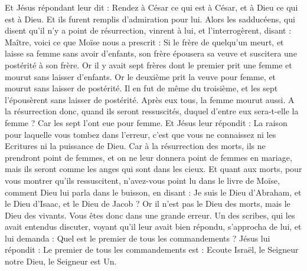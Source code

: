 \begin{multicols}{2}
Et Jésus répondant leur dit : Rendez à César ce qui est à César, et à Dieu ce qui est à Dieu. Et ils furent remplis d'admiration pour lui.
Alors les sadducéens, qui disent qu'il n'y a point de résurrection, vinrent à lui, et l'interrogèrent, disant :
Maître, voici ce que Moïse nous a prescrit : Si le frère de quelqu'un meurt, et laisse sa femme sans avoir d'enfants, son frère épousera sa veuve et suscitera une postérité à son frère.
Or il y avait sept frères dont le premier prit une femme et mourut sans laisser d'enfants.
Or le deuxième prit la veuve pour femme, et mourut sans laisser de postérité. Il en fut de même du troisième,
et les sept l'épousèrent sans laisser de postérité. Après eux tous, la femme mourut aussi.
A la résurrection donc, quand ils seront ressuscités, duquel d'entre eux sera-t-elle la femme ? Car les sept l'ont eue pour femme.
Et Jésus leur répondit : La raison pour laquelle vous tombez dans l'erreur, c'est que vous ne connaissez ni les Ecritures ni la puissance de Dieu.
Car à la résurrection des morts, ils ne prendront point de femmes, et on ne leur donnera point de femmes en mariage, mais ils seront comme les anges qui sont dans les cieux.
Et quant aux morts, pour vous montrer qu'ils ressuscitent, n'avez-vous point lu dans le livre de Moïse, comment Dieu lui parla dans le buisson, en disant : Je suis le Dieu d'Abraham, et le Dieu d'Isaac, et le Dieu de Jacob ?
Or il n'est pas le Dieu des morts, mais le Dieu des vivants. Vous êtes donc dans une grande erreur.
Un des scribes, qui les avait entendus discuter, voyant qu'il leur avait bien répondu, s'approcha de lui, et lui demanda : Quel est le premier de tous les commandements ?
Jésus lui répondit : Le premier de tous les commandements est : Ecoute Israël, le Seigneur notre Dieu, le Seigneur est Un.

\end{multicols}

